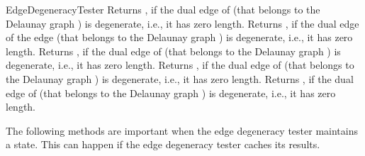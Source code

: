 \begin{ccRefFunctionObjectConcept}{EdgeDegeneracyTester}
\ccThreeToTwo
{}
{Returns , if the dual edge of  (that
  belongs to the Delaunay graph ) is
  degenerate, i.e., it has zero length.}
%
{Returns , if the dual edge of the edge
   (that belongs to the Delaunay graph ) is
  degenerate, i.e., it has zero length.}
%
\ccGlue
{}
{Returns , if the dual edge of  (that
  belongs to the Delaunay graph ) is
  degenerate, i.e., it has zero length.}
%
\ccGlue
{}
{Returns , if the dual edge of  (that
  belongs to the Delaunay graph ) is
  degenerate, i.e., it has zero length.}
%
\ccGlue
{}
{Returns , if the dual edge of   (that
  belongs to the Delaunay graph ) is
  degenerate, i.e., it has zero length.}



The following methods are important when the edge degeneracy tester
maintains a state. This can happen if the edge degeneracy tester
caches its results.

%
\ccGlue
{}
\ccGlue
{}



\end{ccRefFunctionObjectConcept}
